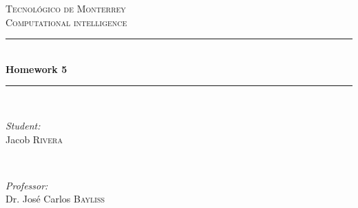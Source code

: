 \documentclass{article}
\begin{document}
\begin{titlepage}

    \newcommand{\HRule}{\rule{\linewidth}{0.5mm}} %

    \center %


    \textsc{\LARGE Tecnológico de Monterrey}\\[1.5cm] %
    \textsc{\Large Computational intelligence}\\[0.5cm] %


    \HRule \\[0.4cm]
    { \huge \bfseries Homework 5}\\[0.4cm] %
    \HRule \\[1.5cm]


    \begin{minipage}{0.4\textwidth}
    \begin{flushleft} \large
    \emph{Student:}\\
    Jacob \textsc{Rivera} %
    \end{flushleft}
    \end{minipage}
    ~
    \begin{minipage}{0.4\textwidth}
    \begin{flushright} \large
    \emph{Professor:} \\
    Dr. José Carlos \textsc{Bayliss} %
    \end{flushright}
    \end{minipage}\\[2cm]


\end{titlepage}
\end{document}
